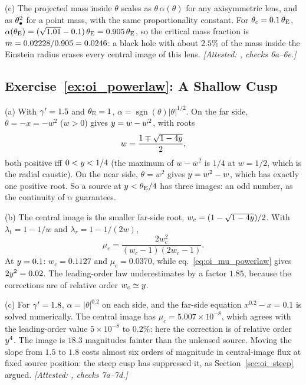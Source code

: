 (c) The projected mass inside $\theta$ scales as
$\theta\,\alpha(\theta)$ for any axisymmetric lens, and as
$\theta_{\bullet}^2$ for a point mass, with the same proportionality constant.
For $\theta_c=0.1\,\theta_{\mathrm{E}}$, $\alpha(\theta_{\mathrm{E}})=(\sqrt{1.01}-0.1)\,\theta_{\mathrm{E}}=0.905\,\theta_{\mathrm{E}}$,
so the critical mass fraction is
$m=0.02228/0.905=0.0246$: a black hole with about $2.5\%$ of the
mass inside the Einstein radius erases every central image of this lens.
\emph{[Attested: , checks 6a--6e.]}

\subsection*{Exercise~\ref{ex:oi_powerlaw}: A Shallow Cusp}

(a) With $\gamma'=1.5$ and $\theta_{\mathrm{E}}=1$, $\alpha=\operatorname{sgn}(\theta)|\theta|^{1/2}$.
On the far side, $\theta=-x=-w^2$ ($w>0$) gives $y=w-w^2$, with roots
\[
  w = \frac{1\mp\sqrt{1-4y}}{2},
\]
both positive iff $0<y<1/4$ (the maximum of $w-w^2$ is $1/4$ at
$w=1/2$, which is the radial caustic).  On the near side,
$\theta=w^2$ gives $y=w^2-w$, which has exactly one positive root.
So a source at $y<\theta_{\mathrm{E}}/4$ has three images: an odd number, as
the continuity of $\alpha$ guarantees.

(b) The central image is the smaller far-side root,
$w_c=(1-\sqrt{1-4y})/2$.  With $\lambda_t=1-1/w$ and
$\lambda_r=1-1/(2w)$,
\[
  \mu_c = \frac{2w_c^2}{(w_c-1)(2w_c-1)} .
\]
At $y=0.1$: $w_c=0.1127$ and $\mu_c=0.0370$, while
eq.~\eqref{eq:oi_mu_powerlaw} gives $2y^2=0.02$.  The leading-order
law underestimates by a factor $1.85$, because the corrections are of
relative order $w_c\simeq y$.

(c) For $\gamma'=1.8$, $\alpha=|\theta|^{0.2}$ on each side, and
the far-side equation $x^{0.2}-x=0.1$ is solved numerically.  The
central image has $\mu_c=5.007\times10^{-8}$, which agrees with
the leading-order value $5\times10^{-8}$ to $0.2\%$: here the correction
is of relative order $y^{4}$.  The image is $18.3$ magnitudes
fainter than the unlensed source.  Moving the slope from $1.5$ to
$1.8$ costs almost six orders of magnitude in central-image flux at
fixed source position: the steep cusp has suppressed it, as
Section~\ref{sec:oi_steep} argued.
\emph{[Attested: , checks 7a--7d.]}
